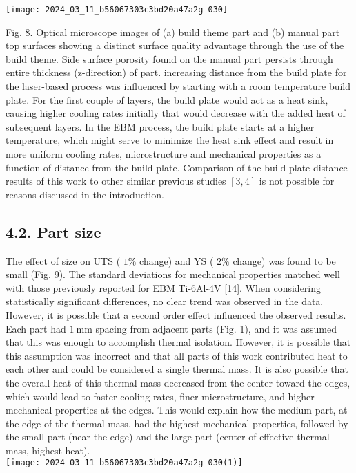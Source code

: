 \documentclass[10pt]{article}
\begin{document}
\begin{center}
\texttt{[image: 2024\_03\_11\_b56067303c3bd20a47a2g-030]}
\end{center}

Fig. 8. Optical microscope images of (a) build theme part and (b) manual part top surfaces showing a distinct surface quality advantage through the use of the build theme. Side surface porosity found on the manual part persists through entire thickness (z-direction) of part. increasing distance from the build plate for the laser-based process was influenced by starting with a room temperature build plate. For the first couple of layers, the build plate would act as a heat sink, causing higher cooling rates initially that would decrease with the added heat of subsequent layers. In the EBM process, the build plate starts at a higher temperature, which might serve to minimize the heat sink effect and result in more uniform cooling rates, microstructure and mechanical properties as a function of distance from the build plate. Comparison of the build plate distance results of this work to other similar previous studies $[3,4]$ is not possible for reasons discussed in the introduction.

\subsection*{4.2. Part size}
The effect of size on UTS ( $1 \%$ change) and YS ( $2 \%$ change) was found to be small (Fig. 9). The standard deviations for mechanical properties matched well with those previously reported for EBM Ti-6Al-4V [14]. When considering statistically significant differences, no clear trend was observed in the data. However, it is possible that a second order effect influenced the observed results. Each part had $1 \mathrm{~mm}$ spacing from adjacent parts (Fig. 1), and it was assumed that this was enough to accomplish thermal isolation. However, it is possible that this assumption was incorrect and that all parts of this work contributed heat to each other and could be considered a single thermal mass. It is also possible that the overall heat of this thermal mass decreased from the center toward the edges, which would lead to faster cooling rates, finer microstructure, and higher mechanical properties at the edges. This would explain how the medium part, at the edge of the thermal mass, had the highest mechanical properties, followed by the small part (near the edge) and the large part (center of effective thermal mass, highest heat).\\
\texttt{[image: 2024\_03\_11\_b56067303c3bd20a47a2g-030(1)]}
\end{document}
